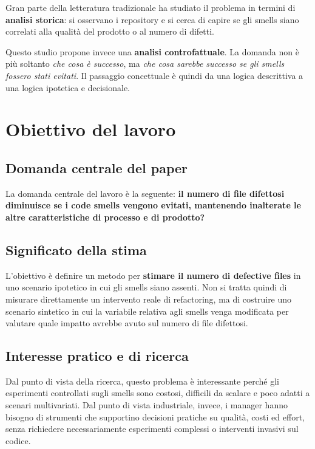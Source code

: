 Gran parte della letteratura tradizionale ha studiato il problema in termini di \textbf{analisi storica}: si osservano i repository e si cerca di capire se gli smells siano correlati alla qualità del prodotto o al numero di difetti.

Questo studio propone invece una \textbf{analisi controfattuale}. La domanda non è più soltanto \emph{che cosa è successo}, ma \emph{che cosa sarebbe successo se gli smells fossero stati evitati}. Il passaggio concettuale è quindi da una logica descrittiva a una logica ipotetica e decisionale.

\section{Obiettivo del lavoro}

\subsection{Domanda centrale del paper}

La domanda centrale del lavoro è la seguente: \textbf{il numero di file difettosi diminuisce se i code smells vengono evitati, mantenendo inalterate le altre caratteristiche di processo e di prodotto?}

\subsection{Significato della stima}

L'obiettivo è definire un metodo per \textbf{stimare il numero di defective files} in uno scenario ipotetico in cui gli smells siano assenti. Non si tratta quindi di misurare direttamente un intervento reale di refactoring, ma di costruire uno scenario sintetico in cui la variabile relativa agli smells venga modificata per valutare quale impatto avrebbe avuto sul numero di file difettosi.

\subsection{Interesse pratico e di ricerca}

Dal punto di vista della ricerca, questo problema è interessante perché gli esperimenti controllati sugli smells sono costosi, difficili da scalare e poco adatti a scenari multivariati. Dal punto di vista industriale, invece, i manager hanno bisogno di strumenti che supportino decisioni pratiche su qualità, costi ed effort, senza richiedere necessariamente esperimenti complessi o interventi invasivi sul codice.

